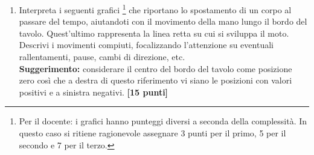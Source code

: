 \documentclass{report} \usepackage[T1]{fontenc} \usepackage[italian]{babel}
\begin{document}
\begin{enumerate}
\item Interpreta i seguenti grafici
\footnote{Per il docente: i grafici hanno punteggi diversi a seconda della
complessità. In questo caso si ritiene ragionevole assegnare 3 punti per il
primo, 5 per il secondo e 7 per il terzo.
}
che riportano lo spostamento di un corpo al
passare del tempo, aiutandoti con il movimento della mano lungo il bordo del
tavolo. Quest’ultimo rappresenta la linea retta su cui si sviluppa il moto.
Descrivi i movimenti compiuti, focalizzando l’attenzione su eventuali
rallentamenti, pause, cambi di direzione, etc.\\
\textbf{Suggerimento:} considerare il centro del bordo del tavolo come posizione zero
così che a destra di questo riferimento vi siano le posizioni con valori
positivi e a sinistra negativi. \hfill \textbf{[15 punti]}


\end{enumerate}
\end{document}
